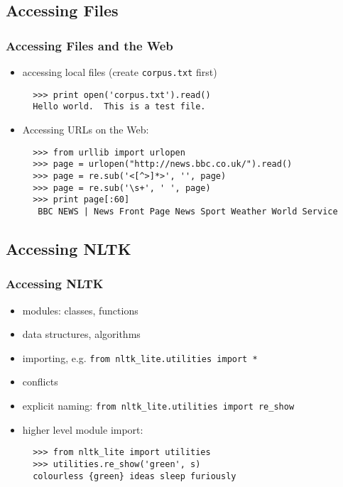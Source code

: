 \documentclass[handout]{beamer}
\begin{document}
\subsection{Accessing Files}

\begin{frame}[fragile]
\frametitle{Accessing Files and the Web}
\begin{itemize}
\item accessing local files (create \texttt{corpus.txt} first)

\begin{verbatim}
  >>> print open('corpus.txt').read() 
  Hello world.  This is a test file.
\end{verbatim}

\item Accessing URLs on the Web:

\begin{verbatim}
  >>> from urllib import urlopen
  >>> page = urlopen("http://news.bbc.co.uk/").read()
  >>> page = re.sub('<[^>]*>', '', page)
  >>> page = re.sub('\s+', ' ', page)
  >>> print page[:60]
   BBC NEWS | News Front Page News Sport Weather World Service
\end{verbatim}
\end{itemize}
\end{frame}

\subsection{Accessing NLTK}

\begin{frame}[fragile]
\frametitle{Accessing NLTK}

\begin{itemize}
\item modules: classes, functions
\item data structures, algorithms
\item importing, e.g. \texttt{from nltk\_lite.utilities import *}
\item conflicts
\item explicit naming: \texttt{from nltk\_lite.utilities import re\_show}
\item higher level module import:

\begin{verbatim}
  >>> from nltk_lite import utilities
  >>> utilities.re_show('green', s)
  colourless {green} ideas sleep furiously
\end{verbatim}
\end{itemize}
\end{frame}
\end{document}
